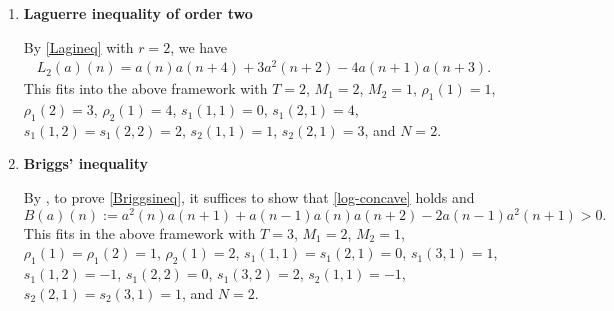 \documentclass[11pt,reqno,a4paper]{amsart}
\renewcommand{\(}{\left\(}
\renewcommand{\)}{\right\)}
\numberwithin{equation}{section}
\theoremstyle{plain}
\theoremstyle{definition} %
\numberwithin{equation}{section}
\begin{document}
\begin{enumerate}[
	label=(E\arabic*),
	wide,
	labelwidth=!,
	labelindent=0pt
	]
\item {\bf Laguerre inequality of order two}	

\noindent \label{L2} By \eqref{Lagineq} with $r=2$, we have 
\begin{align*}
L_2(a)(n)=a(n)a(n+4)\!+\!3a^2(n+2)\!-\!4a(n+1)a(n+3).
\end{align*}
 This fits into the above framework with $T=2$, $M_1=2$, $M_2=1$, $\rho_1(1)=1$, $\rho_1(2)=3$, $\rho_2(1)=4$, $s_1(1,1)=0$, $s_1(2,1)=4$, $s_1(1,2)=s_1(2,2)=2$, $s_2(1,1)=1$, $s_2(2,1)=3$, and $N=2$.

\vspace{0.2 cm} 

\item {\bf Briggs' inequality} 

\noindent \label{Briggsineq3} By \cite[equation (3)]{LZ}, to prove \eqref{Briggsineq}, it suffices to show that \eqref{log-concave} holds and 
\begin{equation}\label{Briggsineq2}
B(a)(n):=a^2(n)a(n+1)+a(n-1)a(n)a(n+2)-2a(n-1)a^2(n+1)>0.
\end{equation}
This fits in the above framework with $T=3$, $M_1=2$, $M_2=1$, $\rho_1(1)=\rho_1(2)=1$, $\rho_2(1)=2$, $s_1(1,1)=s_1(2,1)=0$, $s_1(3,1)=1$, $s_1(1,2)=-1$, $s_1(2,2)=0$, $s_1(3,2)=2$, $s_2(1,1)=-1$, $s_2(2,1)=s_2(3,1)=1$, and $N=2$. 
\end{enumerate}
\end{document}
